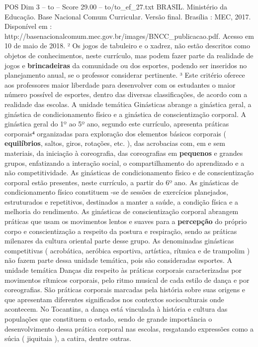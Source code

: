 \begin{textsample}{POS Dim 3 – to – Score 29.00 – to/to\_ef\_27.txt}
BRASIL.
Ministério da Educação.
Base Nacional Comum Curricular.
Versão final.
Brasília : MEC, 2017.
Disponível em : http://basenacionalcomum.mec.gov.br/images/BNCC\_publicacao.pdf.
Acesso em 10 de maio de 2018. ² Os jogos de tabuleiro e o xadrez, não estão descritos como objetos de conhecimentos, neste currículo, mas podem fazer parte da realidade de jogos e \textbf{brincadeiras} da comunidade ou dos esportes, podendo ser inseridos no planejamento anual, se o professor considerar pertinente. ³ Este critério oferece aos professores maior liberdade para desenvolver com os estudantes o maior número possível de esportes, dentro das diversas classificações, de acordo com a realidade das escolas.
A unidade temática Ginásticas abrange a ginástica geral, a ginástica de condicionamento físico e a ginástica de conscientização corporal.
A ginástica geral do 1º ao 5º ano, segundo este currículo, apresenta práticas corporais⁴ organizadas para exploração dos elementos básicos corporais ( \textbf{equilíbrios}, saltos, giros, rotações, etc. ), das acrobacias com, em e sem materiais, da iniciação à coreografia, das coreografias em \textbf{pequenos} e grandes grupos, enfatizando a interação social, o compartilhamento do aprendizado e a não competitividade.
As ginásticas de condicionamento físico e de conscientização corporal estão presentes, neste currículo, a partir do 6º ano.
As ginásticas de condicionamento físico constituem -se de sessões de exercícios planejados, estruturados e repetitivos, destinados a manter a saúde, a condição física e a melhoria do rendimento.
As ginásticas de conscientização corporal abrangem práticas que usam os movimentos lentos e suaves para a \textbf{percepção} do próprio corpo e conscientização a respeito da postura e respiração, sendo as práticas milenares da cultura oriental parte desse grupo.
As denominadas ginásticas competitivas ( acrobática, aeróbica esportiva, artística, rítmica e de trampolim ) não fazem parte dessa unidade temática, pois são consideradas esportes.
A unidade temática Danças diz respeito às práticas corporais caracterizadas por movimentos rítmicos corporais, pelo ritmo musical de cada estilo de dança e por coreografias.
São práticas corporais marcadas pela história sobre suas origens e que apresentam diferentes significados nos contextos socioculturais onde acontecem.
No Tocantins, a dança está vinculada à história e cultura das populações que constituem o estado, sendo de grande importância o desenvolvimento dessa prática corporal nas escolas, resgatando expressões como a súcia ( jiquitaia ), a catira, dentre outras.

\end{textsample}
